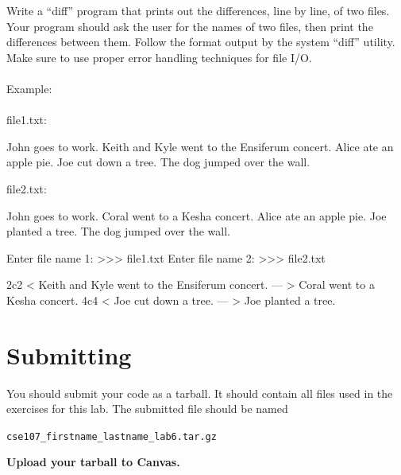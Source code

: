 \documentclass[11pt]{cselabheader}
\begin{document}
	\begin{ex}[diff.py]
		Write a ``diff'' program that prints out the differences, line by line, of two files.  Your program should ask the user for the names of two files, then print the differences between them.  Follow the format output by the system ``diff'' utility.  Make sure to use proper error handling techniques for file I/O.\\\\
		Example:\\\\
		file1.txt:
		\begin{python3code}
		John goes to work.
		Keith and Kyle went to the Ensiferum concert.
		Alice ate an apple pie.
		Joe cut down a tree.
		The dog jumped over the wall.
		\end{python3code}
		file2.txt:
		\begin{python3code}
		John goes to work.
		Coral went to a Kesha concert.
		Alice ate an apple pie.
		Joe planted a tree.
		The dog jumped over the wall.
		\end{python3code}
		\begin{python3code}
		Enter file name 1: >>> file1.txt
		Enter file name 2: >>> file2.txt
		
		2c2
		< Keith and Kyle went to the Ensiferum concert.
		---
		> Coral went to a Kesha concert.
		4c4
		< Joe cut down a tree.
		---
		> Joe planted a tree.
		\end{python3code}
	\end{ex}


\pagebreak
\section{Submitting}

You should submit your code as a tarball. It should contain all files
used in the exercises for this lab. The submitted file should be named
\begin{center}
  \texttt{cse107\_firstname\_lastname\_lab6.tar.gz}
\end{center}

\begin{center}
  \textbf{Upload your tarball to Canvas.}
\end{center}

\listoftheorems
\end{document}
